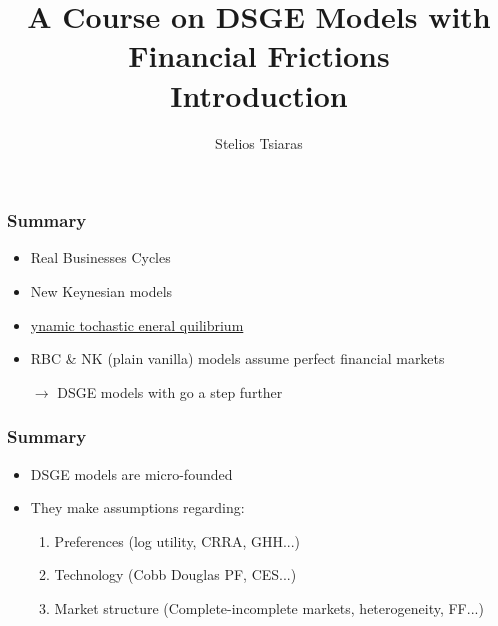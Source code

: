 \documentclass[xcolor=dvipsnames,handout,aspectratio=169]{beamer}
\title[\today]{\textbf{A Course on DSGE Models with Financial Frictions \\ Introduction}}
\author{Stelios Tsiaras}
\institute{European University Institute}
\begin{document}
\begin{frame}[noframenumbering]
\titlepage 
\end{frame}

\begin{frame}[c]\frametitle {\textbf{Summary}} \label{conclusion}
\begin{itemize}
    \setlength\itemsep{2em}
    \item Real Businesses Cycles 
    \item New Keynesian models 
    \item \underline{{\color{Magenta}{D}}ynamic {\color{Magenta}{S}}tochastic {\color{Magenta}{G}}eneral {\color{Magenta}{E}}quilibrium}
    \item RBC \& NK (plain vanilla) models assume perfect financial markets 

$\rightarrow$ DSGE models with {\color{Magenta}{financial frictions}} go a step further
\end{itemize}
\end{frame}

\begin{frame}[c]\frametitle {\textbf{Summary}} \label{conclusion}
\begin{itemize}
    \setlength\itemsep{2em}
\item DSGE models are micro-founded 
\item They make assumptions regarding: 
\begin{enumerate}
    \item Preferences (log utility, CRRA, GHH...)
    \item Technology (Cobb Douglas PF, CES...)
    \item Market structure (Complete-incomplete markets, heterogeneity, FF...)
\end{enumerate}

\end{itemize}
\end{frame}
\end{document}
